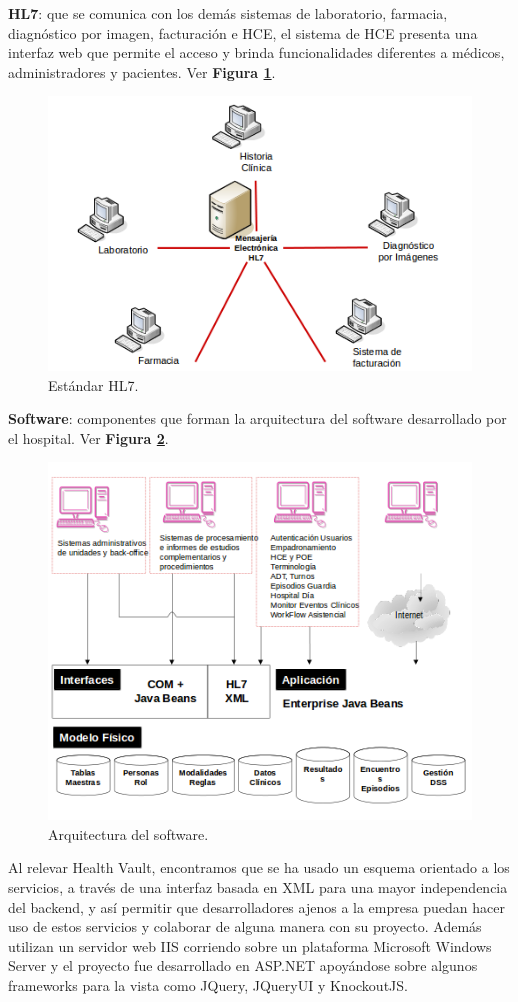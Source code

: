 \textbf{HL7}:
 que se comunica con los demás sistemas de laboratorio, farmacia, diagnóstico por imagen, facturación e HCE, el sistema de HCE presenta una interfaz web que permite el acceso y brinda funcionalidades diferentes a médicos, administradores y pacientes. Ver \textbf{Figura \ref{esthl7}}.
\begin{figure}
  \centering
  \includegraphics[width=.8\textwidth]{img/tp1/hl7}
  \caption{Estándar HL7.}
  \label{esthl7}
\end{figure}

	\textbf{Software}: componentes que forman la arquitectura del software desarrollado por el hospital. Ver \textbf{Figura \ref{arqsw}}.
\begin{figure}
  \centering
  \includegraphics[width=.8\textwidth]{img/tp1/modgenfinal}
  \caption{Arquitectura del software.}
  \label{arqsw}
\end{figure}

Al relevar Health Vault, encontramos que se ha usado un esquema orientado a los servicios, a través de una interfaz basada en XML para una mayor independencia del backend, y así permitir que desarrolladores ajenos a la empresa puedan hacer uso de estos servicios y colaborar de alguna manera con su proyecto. Además utilizan un servidor web IIS corriendo sobre un plataforma Microsoft Windows Server y el proyecto fue desarrollado en ASP.NET apoyándose sobre algunos frameworks para la vista como JQuery, JQueryUI y KnockoutJS.


